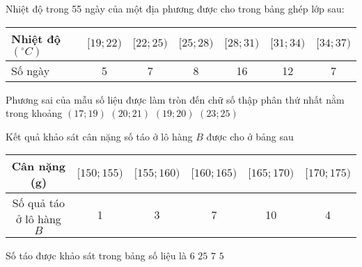 \begin{ex}%
	Nhiệt độ trong 55 ngày của một địa phương được cho trong bảng ghép lớp sau:
	\begin{center}
		\begin{tabular}{|l|c|c|c|c|c|c|}
			\hline
			Nhiệt độ $\left(^{\circ} C\right)$ & {$[19; 22)$} & {$[22; 25)$} & {$[25; 28)$} & {$[28; 31)$} & {$[31; 34)$} & {$[34; 37)$} \\
			\hline
			Số ngày & 5 & 7 & 8 & 16 & 12 & 7 \\
			\hline
		\end{tabular}
	\end{center}
	Phương sai của mẫu số liệu được làm tròn đến chữ số thập phân thứ nhất nằm trong khoảng
	\choice
	{$(17; 19)$}
	{$(20; 21)$}
	{\True$(19; 20)$}
	{$(23; 25)$}
\end{ex}

%

\begin{ex}%
	Kết quả khảo sát cân nặng số táo ở lô hàng $B$ được cho ở bảng sau
	\begin{center}
		\begin{tabular}{|c|c|c|c|c|c|}
			\hline
			Cân nặng (g) & {$[150; 155)$} & {$[155; 160)$} & {$[160; 165)$} & {$[165; 170)$} & {$[170; 175)$} \\
			\hline
			Số quả táo ở lô hàng $B$ & 1 & 3 & 7 & 10 & 4 \\
			\hline
		\end{tabular}
	\end{center}
	Số táo được khảo sát trong bảng số liệu là
	\choice
	{$6$}
	{\True $25$}
	{$7$}
	{$5$}
\end{ex}

